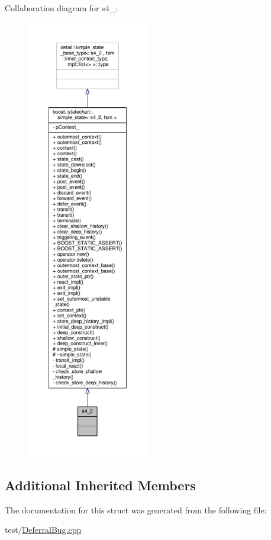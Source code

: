 Collaboration diagram for s4\+\_\+:
\nopagebreak
\begin{figure}[H]
\begin{center}
\leavevmode
\includegraphics[height=550pt]{structs4__2__coll__graph}
\end{center}
\end{figure}
\subsection*{Additional Inherited Members}


The documentation for this struct was generated from the following file\+:\begin{DoxyCompactItemize}
\item 
test/\mbox{\hyperlink{_deferral_bug_8cpp}{Deferral\+Bug.\+cpp}}\end{DoxyCompactItemize}
